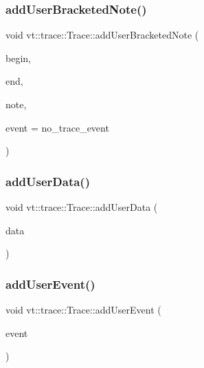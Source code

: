 \subsubsection{\texorpdfstring{add\+User\+Bracketed\+Note()}{addUserBracketedNote()}}
{\footnotesize\ttfamily void vt\+::trace\+::\+Trace\+::add\+User\+Bracketed\+Note (\begin{DoxyParamCaption}\item[{double const}]{begin,  }\item[{double const}]{end,  }\item[{std\+::string const \&}]{note,  }\item[{\hyperlink{namespacevt_1_1trace_a64a7185f3e102df8d8258f263ccd1582}{Trace\+Event\+I\+D\+Type} const}]{event = {\ttfamily no\+\_\+trace\+\_\+event} }\end{DoxyParamCaption})}

\mbox{\label{structvt_1_1trace_1_1_trace_a7f5ede52aa552c2eac88b894853a2efe}} 
\subsubsection{\texorpdfstring{add\+User\+Data()}{addUserData()}}
{\footnotesize\ttfamily void vt\+::trace\+::\+Trace\+::add\+User\+Data (\begin{DoxyParamCaption}\item[{int32\+\_\+t}]{data }\end{DoxyParamCaption})}

\mbox{\label{structvt_1_1trace_1_1_trace_a0a4bbdf7bd3c2b8742cbceb24389a4c0}} 
\subsubsection{\texorpdfstring{add\+User\+Event()}{addUserEvent()}}
{\footnotesize\ttfamily void vt\+::trace\+::\+Trace\+::add\+User\+Event (\begin{DoxyParamCaption}\item[{\hyperlink{namespacevt_1_1trace_a5908920d051c144c89f17c69ed262350}{User\+Event\+I\+D\+Type}}]{event }\end{DoxyParamCaption})}

